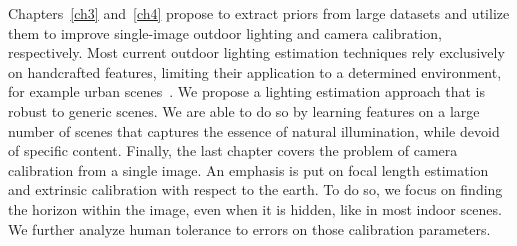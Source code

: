 Chapters~\ref{ch3} and~\ref{ch4} propose to extract priors from large datasets and utilize them to improve single-image outdoor lighting and camera calibration, respectively. Most current outdoor lighting estimation techniques rely exclusively on handcrafted features, limiting their application to a determined environment, for example urban scenes~\cite{lalonde-ijcv-12}. We propose a lighting estimation approach that is robust to generic scenes. We are able to do so by learning features on a large number of scenes that captures the essence of natural illumination, while devoid of specific content. Finally, the last chapter covers the problem of camera calibration from a single image. An emphasis is put on focal length estimation and extrinsic calibration with respect to the earth. To do so, we focus on finding the horizon within the image, even when it is hidden, like in most indoor scenes. We further analyze human tolerance to errors on those calibration parameters. 



%
%

